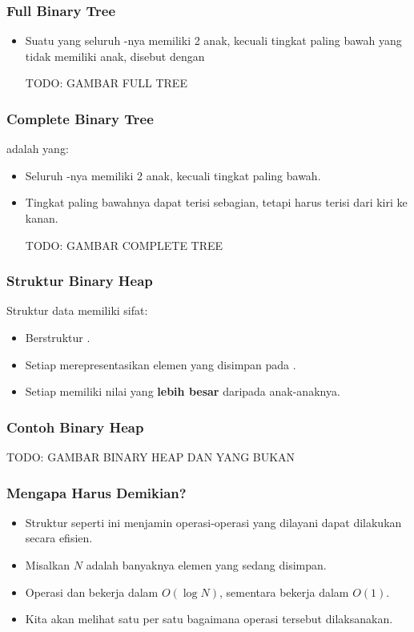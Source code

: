\begin{frame}
\frametitle{Full Binary Tree}
\begin{itemize}
  \item Suatu  yang seluruh \fnode-nya memiliki 2 anak, kecuali tingkat paling bawah yang tidak memiliki anak, disebut dengan 
  
  TODO: GAMBAR FULL TREE
\end{itemize}
\end{frame}

\begin{frame}
\frametitle{Complete Binary Tree}
 adalah  yang:
\begin{itemize}
  \item Seluruh \fnode-nya memiliki 2 anak, kecuali tingkat paling bawah.
  \item Tingkat paling bawahnya dapat terisi sebagian, tetapi harus terisi dari kiri ke kanan.
  
  TODO: GAMBAR COMPLETE TREE
\end{itemize}
\end{frame}

\begin{frame}
\frametitle{Struktur Binary Heap}
Struktur data \pbinaryHeap memiliki sifat:
\begin{itemize}
  \item Berstruktur .
  \item Setiap \fnode merepresentasikan elemen yang disimpan pada \pheap.
  \item Setiap \fnode memiliki nilai yang \textbf{lebih besar} daripada \fnode anak-anaknya.
\end{itemize}
\end{frame}

\begin{frame}
\frametitle{Contoh Binary Heap}
TODO: GAMBAR BINARY HEAP DAN YANG BUKAN
\end{frame}

\begin{frame}
\frametitle{Mengapa Harus Demikian?}
\begin{itemize}
  \item Struktur seperti ini menjamin operasi-operasi yang dilayani \pheap dapat dilakukan secara efisien.
  \item Misalkan $N$ adalah banyaknya elemen yang sedang disimpan.
  \item Operasi  dan  bekerja dalam $O(\log{N})$, sementara  bekerja dalam $O(1)$.
  \item Kita akan melihat satu per satu bagaimana operasi tersebut dilaksanakan.
\end{itemize}
\end{frame}

